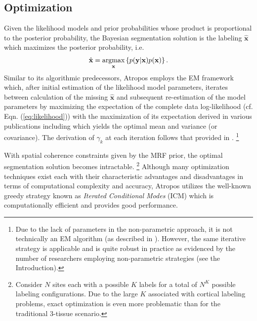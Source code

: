 \documentclass[11pt,english]{article}
\newcommand{\argmax}{\operatornamewithlimits{argmax}}
\begin{document}
\subsection{Optimization}
Given the likelihood models and prior probabilities whose product is proportional to the posterior probability, the Bayesian segmentation solution is the labeling $\hat{\mathbf{x}}$ which maximizes the posterior probability, i.e.
\begin{align}
  \hat{\mathbf{x}} = \argmax_{\mathbf{x}} \left\{p(\mathbf{y}|\mathbf{x})p(\mathbf{x})\right\}.
\end{align}
Similar to its algorithmic predecessors, Atropos employs the EM framework \citep{Dempster1977} which, after initial estimation of the likelihood model parameters, iterates between calculation of the missing $\hat{\mathbf{x}}$ and subsequent re-estimation of the model parameters by maximizing the expectation of the complete data log-likelihood (cf. Eqn. (\ref{eq:likelihood})) 
with the maximization of its expectation derived in various publications including \cite{Zhang2001} which yields the optimal mean and variance (or covariance).  The derivation of $\gamma_k$ at each iteration follows that provided in \cite{Ashburner2005}.%
\footnote{
Due to the lack of parameters in the non-parametric approach, it is not technically an EM algorithm (as described in \cite{Wells1996}).  However, the same iterative strategy is applicable and is quite robust in practice as evidenced by the number of researchers employing non-parametric strategies (see the Introduction).
}  

With spatial coherence constraints given by the MRF prior, the optimal segmentation solution becomes intractable.%
\footnote{
Consider $N$ sites each with a possible $K$ labels for a total of $N^K$ possible labeling configurations.  Due to the large $K$ associated with cortical labeling problems, exact optimization is even more problematic than for the traditional 3-tissue scenario.
}
Although many optimization techniques exist \citep[see the introduction in][for a concise summary of the myriad optimization possibilities]{Marroquin2002} each with their characteristic advantages and disadvantages in terms of computational complexity and accuracy,  Atropos utilizes the well-known greedy strategy known as {\em Iterated Conditional Modes} (ICM)  \citep{Besag1986} which is computationally efficient and provides good performance.
\end{document}
